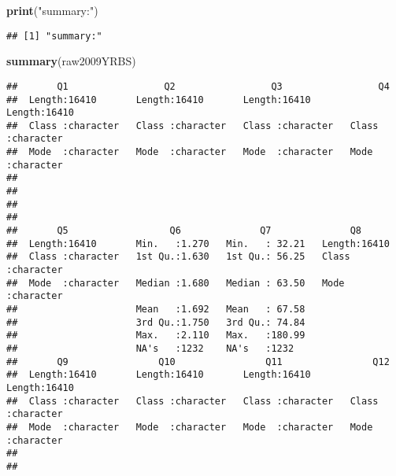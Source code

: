 \documentclass[
]{article}
\newenvironment{Shaded}{\begin{snugshade}}{\end{snugshade}}
\newcommand{\FunctionTok}[1]{\textcolor[rgb]{0.13,0.29,0.53}{\textbf{#1}}}
\newcommand{\NormalTok}[1]{#1}
\newcommand{\StringTok}[1]{\textcolor[rgb]{0.31,0.60,0.02}{#1}}
\begin{document}
\begin{Shaded}
\begin{Highlighting}[]
\FunctionTok{print}\NormalTok{(}\StringTok{"summary:"}\NormalTok{)}
\end{Highlighting}
\end{Shaded}

\begin{verbatim}
## [1] "summary:"
\end{verbatim}

\begin{Shaded}
\begin{Highlighting}[]
\FunctionTok{summary}\NormalTok{(raw2009YRBS)}
\end{Highlighting}
\end{Shaded}

\begin{verbatim}
##       Q1                 Q2                 Q3                 Q4           
##  Length:16410       Length:16410       Length:16410       Length:16410      
##  Class :character   Class :character   Class :character   Class :character  
##  Mode  :character   Mode  :character   Mode  :character   Mode  :character  
##                                                                             
##                                                                             
##                                                                             
##                                                                             
##       Q5                  Q6              Q7              Q8           
##  Length:16410       Min.   :1.270   Min.   : 32.21   Length:16410      
##  Class :character   1st Qu.:1.630   1st Qu.: 56.25   Class :character  
##  Mode  :character   Median :1.680   Median : 63.50   Mode  :character  
##                     Mean   :1.692   Mean   : 67.58                     
##                     3rd Qu.:1.750   3rd Qu.: 74.84                     
##                     Max.   :2.110   Max.   :180.99                     
##                     NA's   :1232    NA's   :1232                       
##       Q9                Q10                Q11                Q12           
##  Length:16410       Length:16410       Length:16410       Length:16410      
##  Class :character   Class :character   Class :character   Class :character  
##  Mode  :character   Mode  :character   Mode  :character   Mode  :character  
##                                                                             
##                                                                             

\end{verbatim}
\end{document}
